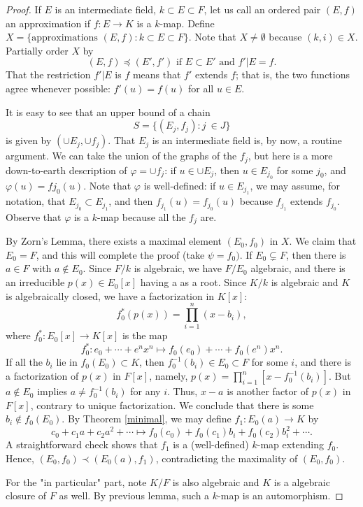 \documentclass[12pt]{report}
\theoremstyle{definition}
\begin{document}
\begin{proof}
	If $E$ is an intermediate field, $k \subset  E \subset  F$, let us call an ordered pair $(E, f)$ an approximation if $f : E \to K$ is a $k$-map. Define $X = \{\mbox{approximations } (E, f) : k \subset  E \subset  F\}$. Note that $X \not= \emptyset$ because $(k, i) \in X$. Partially order $X$ by $$(E, f) \preceq (E', f') \mbox{ if } E \subset E' \mbox{ and } f'|E = f.$$
	That the restriction $f'|E$ is $f$ means that $f'$ extends $f$; that is, the two functions agree whenever possible: $f'(u) = f(u)$ for all $u \in E$.

	It is easy to see that an upper bound of a chain $$S = \{(E_j, f_j) : j\ \in J\}$$ is given by $(\cup E_j,\cup f_j)$. That $E_j$ is an intermediate field is, by now, a routine argument. We can take the union of the graphs of the $f_j$, but here is a more down-to-earth description of $\varphi =\cup f_j$: if $u \in \cup E_j$, then $u \in E_{j_0}$ for some $j_0$, and $\varphi(u)= fj_0 (u)$. Note that $\varphi$ is well-defined: if $u \in E_{j_1}$, we may assume, for notation, that $E_{j_0} \subset  E_{j_1}$, and then $f_{j_1} (u) = f_{j_0} (u)$ because $f_{j_1}$ extends $f_{j_0}$. Observe that $\varphi$ is a $k$-map because all the $f_j$ are.

	By Zorn's Lemma, there exists a maximal element $(E_0, f_0)$ in $X$. We claim that $E_0 = F$, and this will complete the proof (take $\psi  = f_0)$. If $E_0 \subsetneq F$, then there is $a \in F$ with $a \notin E_0$. Since $F/k$ is algebraic, we have $F/E_0$ algebraic, and there is an irreducible $p(x) \in E_0[x]$ having a as a root. Since $K/k$ is algebraic and $K$ is algebraically closed, we have a factorization in $K[x]$: $$f_0^*(p(x)) = \prod_{i=1}^n(x-b_i),$$ where $f_0^*: E_0[x] \to K[x]$ is the map $$f^*_0 : e_0 + \cdots + e^nx^n \mapsto f_0(e_0) +\cdots + f_0(e^n)x^n.$$ If all the $b_i$ lie in $f_0(E_0) \subset K$, then $f^{-1}_0 (b_i) \in E_0 \subset  F$ for some $i$, and there is a factorization of $p(x)$ in $F[x]$, namely, $p(x) =\prod_{i=1}^n[x - f^{-1}_0 (b_i)]$. But $a \notin E_0$ implies $a \not= f^{-1}_0 (b_i)$ for any $i$. Thus, $x - a$ is another factor of $p(x)$ in $F[x]$, contrary to unique factorization. We conclude that there is some $b_i \notin f_0(E_0)$. By Theorem \ref{minimal}, we may define $f_1 : E_0(a) \to K$ by $$c_0 + c_1a + c_2a^2 +\cdots \mapsto f_0(c_0) + f_0(c_1)b_i + f_0(c_2)b^2_i+\cdots .$$ A straightforward check shows that $f_1$ is a (well-defined) $k$-map extending $f_0$. Hence, $(E_0, f_0) \prec (E_0(a), f_1)$, contradicting the maximality of $(E_0, f_0)$.

	For the "in particular" part, note $K/F$ is also algebraic and $K$ is a algebraic closure of $F$ as well. By previous lemma, such a $k$-map is an automorphism.
\end{proof}
\end{document}
